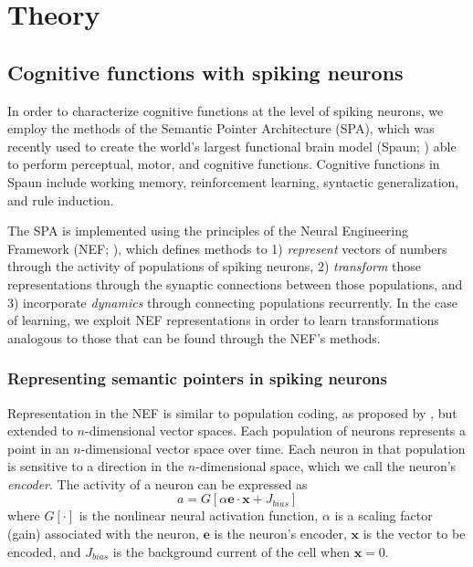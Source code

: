 \documentclass[10pt,letterpaper]{article}
\begin{document}
\section{Theory}

\subsection{Cognitive functions with spiking neurons}

In order to characterize cognitive functions
at the level of spiking neurons,
we employ the methods of the Semantic Pointer Architecture (SPA),
which was recently used to create the world's largest
functional brain model (Spaun; )
able to perform perceptual, motor, and cognitive functions.
Cognitive functions in Spaun include working memory,
reinforcement learning, syntactic generalization,
and rule induction.

The SPA is implemented using the principles of
the Neural Engineering Framework (NEF; ),
which defines methods to
1) \textit{represent} vectors of numbers
through the activity of populations of spiking neurons,
2) \textit{transform} those representations through
the synaptic connections between those populations, and
3) incorporate \textit{dynamics} through
connecting populations recurrently.
In the case of learning,
we exploit NEF representations in order to
learn transformations analogous
to those that can be found through the NEF's methods.

\subsubsection{Representing semantic pointers in spiking neurons}

Representation in the NEF is
similar to population coding, as proposed by
,
but extended to $n$-dimensional vector spaces.
Each population of neurons represents
a point in an $n$-dimensional vector space over time.
Each neuron in that population is sensitive to
a direction in the $n$-dimensional space,
which we call the neuron's \textit{encoder}.
The activity of a neuron can be expressed as
\begin{equation}
  a = G[\alpha \mathbf{e} \cdot \mathbf{x} + J_{bias}]
\end{equation}
where $G[\cdot]$ is the nonlinear neural activation function,
$\alpha$ is a scaling factor (gain) associated with the neuron,
$\mathbf{e}$ is the neuron's encoder,
$\mathbf{x}$ is the vector to be encoded, and
$J_{bias}$ is the background current of the cell
when $\mathbf{x} = 0$.
\end{document}
